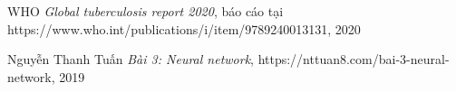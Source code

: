 \begin{thebibliography}{99}
	 WHO {\it Global tuberculosis report 2020}, báo cáo tại https://www.who.int/publications/i/item/9789240013131, 2020
	
	 Nguyễn Thanh Tuấn {\it Bài 3: Neural network}, https://nttuan8.com/bai-3-neural-network, 2019
	
\end{thebibliography}
%